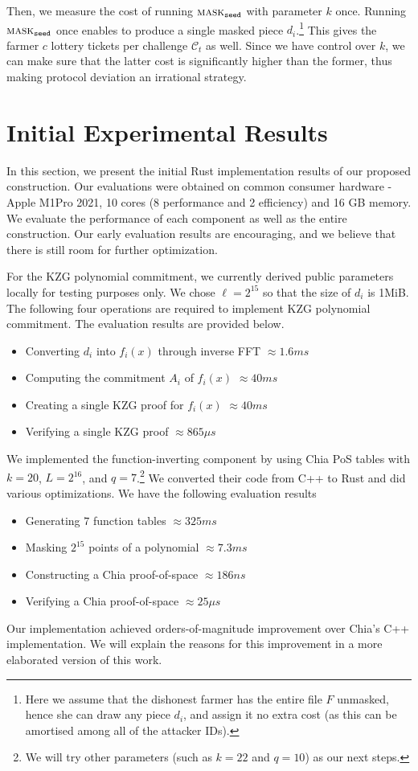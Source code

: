 \documentclass[conference]{IEEEtran}
\newcommand{\seed}{\texttt{seed}}
\newcommand{\mask}{\textsc{mask}}
\begin{document}
Then, we measure the cost of running $\mask_{\seed}$ with parameter $k$ once. Running $\mask_{\seed}$ once enables to produce a single masked piece $d_i$.\footnote{Here we assume that the dishonest farmer has the entire file $F$ unmasked, hence she can draw any piece $d_i$, and assign it no extra cost (as this can be amortised among all of the attacker IDs).} This gives the farmer $c$ lottery tickets per challenge $\mathcal{C}_t$ as well. Since we have control over $k$, we can make sure that the latter cost is significantly higher than the former, thus making protocol deviation an irrational strategy.


\section{Initial Experimental Results}

In this section, we present the initial Rust implementation results of our proposed construction. 
Our evaluations were obtained on common consumer hardware - Apple M1Pro 2021, 10 cores (8 performance and 2 efficiency) and 16 GB memory.
We evaluate the performance of each component as well as the entire construction.  Our early evaluation results are encouraging, and we believe that there is still room for further optimization. 

For the KZG polynomial commitment, we currently derived public parameters locally for testing purposes only. We chose $\ell = 2^{15}$ so that the size of $d_i$ is 1MiB. 
The following four operations are required to implement KZG polynomial commitment. The evaluation results are provided below.
\begin{itemize}
    \item Converting $d_i$ into $f_i(x)$ through inverse FFT $\approx 1.6 ms$
    \item Computing the commitment $A_i$ of $f_i(x)$ $\approx 40 ms$
    \item Creating a single KZG proof for $f_i(x)$ $\approx 40 ms$
    \item Verifying a single KZG proof $\approx 865 \mu s$
\end{itemize}

We implemented the function-inverting component by using Chia PoS tables with $k = 20$, $L = 2^{16}$, and $q = 7$.\footnote{We will try other parameters (such as $k = 22$ and $q = 10$) as our next steps.} We converted their code from C++ to Rust and did various optimizations.  We have the following evaluation results
\begin{itemize}
    \item Generating $7$ function tables $\approx 325 ms$
    \item Masking $2^{15}$ points of a polynomial $\approx 7.3 ms$
    \item Constructing a Chia proof-of-space $\approx 186 ns$
    \item Verifying a Chia proof-of-space $\approx 25 \mu s$
\end{itemize}   
Our implementation achieved orders-of-magnitude improvement over Chia's C++ implementation. We will explain the reasons for this improvement in a more elaborated version of this work.
\end{document}
